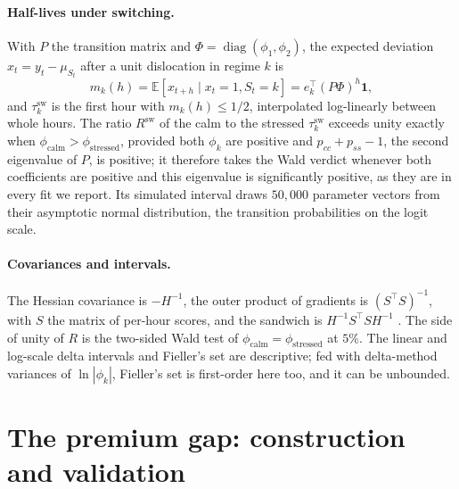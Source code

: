 \documentclass[10pt,a4paper]{article}
\newcommand{\E}{\mathbb{E}}
\newcommand{\given}{\mid}
\newcommand{\Rsw}{R^{\text{sw}}}
\begin{document}
\paragraph{Half-lives under switching.} With $P$ the transition matrix and $\Phi = \operatorname{diag}(\phi_1, \phi_2)$, the expected deviation $x_t = y_t - \mu_{S_t}$ after a unit dislocation in regime $k$ is
\begin{equation}\label{eq:switching}
  m_k(h) = \E[x_{t+h}\given x_t = 1, S_t = k] = e_k^{\top} (P\Phi)^h \mathbf{1},
\end{equation}
and $\tau^{\text{sw}}_k$ is the first hour with $m_k(h) \le 1/2$, interpolated log-linearly between whole hours. The ratio $\Rsw$ of the calm to the stressed $\tau^{\text{sw}}_k$ exceeds unity exactly when $\phi_{\text{calm}} > \phi_{\text{stressed}}$, provided both $\phi_k$ are positive and $p_{cc} + p_{ss} - 1$, the second eigenvalue of $P$, is positive; it therefore takes the Wald verdict whenever both coefficients are positive and this eigenvalue is significantly positive, as they are in every fit we report. Its simulated interval draws $50{,}000$ parameter vectors from their asymptotic normal distribution, the transition probabilities on the logit scale.

\begin{sloppypar}
\paragraph{Covariances and intervals.} The Hessian covariance is $-H^{-1}$, the outer product of gradients is $(S^{\top}S)^{-1}$, with $S$ the matrix of per-hour scores, and the sandwich is $H^{-1}S^{\top}S H^{-1}$ \citep{white1982}. The side of unity of $R$ is the two-sided Wald test of $\phi_{\text{calm}} = \phi_{\text{stressed}}$ at $5\%$. The linear and log-scale delta intervals and Fieller's set \citep{fieller1954} are descriptive; fed with delta-method variances of $\ln|\phi_k|$, Fieller's set is first-order here too, and it can be unbounded.
\end{sloppypar}

\section{The premium gap: construction and validation}\label{app:gap}
\end{document}
